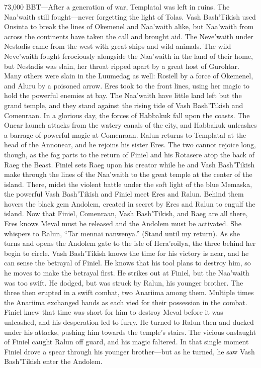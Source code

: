 \documentclass[smalldemyvopaper,11pt,twoside,onecolumn,openright,extrafontsizes]{memoir}
\begin{document}
73,000 BBT—After a generation of war, Templatal was left in ruins. The Naa’waith still fought—never forgetting the light of Tolas. Vash Bash’Tikish used Onsinta to break the lines of Okemenel and Naa’waith alike, but Naa’waith from across the continents have taken the call and brought aid. The Neve’waith under Nestadis came from the west with great ships and wild animals. The wild Neve’waith fought ferociously alongside the Naa’waith in the land of their home, but Nestadis was slain, her throat ripped apart by a great host of Gurohtar. Many others were slain in the Luumedag as well: Rosiell by a force of Okemenel, and Aluru by a poisoned arrow. Eres took to the front lines, using her magic to hold the powerful enemies at bay. The Naa’waith have little land left but the grand temple, and they stand against the rising tide of Vash Bash’Tikish and Comenraan. In a glorious day, the forces of Habbakuk fall upon the coasts. The Onear launch attacks from the watery canals of the city, and Habbakuk unleashes a barrage of powerful magic at Comenraan. Ralun returns to Templatal at the head of the Annonear, and he rejoins his sister Eres. The two cannot rejoice long, though, as the fog parts to the return of Finiel and his Rotasere atop the back of Raeg the Beast. Finiel sets Raeg upon his creator while he and Vash Bash’Tikish make through the lines of the Naa’waith to the great temple at the center of the island. There, midst the violent battle under the soft light of the blue Memaska, the powerful Vash Bash’Tikish and Finiel meet Eres and Ralun. Behind them hovers the black gem Andolem, created in secret by Eres and Ralun to engulf the island. Now that Finiel, Comenraan, Vash Bash’Tikish, and Raeg are all there, Eres knows Meval must be released and the Andolem must be activated. She whispers to Ralun, “Tar mennai nanwenya.” (Stand until my return).
As she turns and opens the Andolem gate to the isle of Hera’roilya, the three behind her begin to circle. Vash Bash’Tikish knows the time for his victory is near, and he can sense the betrayal of Finiel. He knows that his tool plans to destroy him, so he moves to make the betrayal first. He strikes out at Finiel, but the Naa’waith was too swift. He dodged, but was struck by Ralun, his younger brother. The three then erupted in a swift combat, two Anariima among them. Multiple times the Anariima exchanged hands as each vied for their possession in the combat. Finiel knew that time was short for him to destroy Meval before it was unleashed, and his desperation led to furry. He turned to Ralun then and ducked under his attacks, pushing him towards the temple’s stairs. The vicious onslaught of Finiel caught Ralun off guard, and his magic faltered. In that single moment Finiel drove a spear through his younger brother—but as he turned, he saw Vash Bash’Tikish enter the Andolem.
\end{document}
